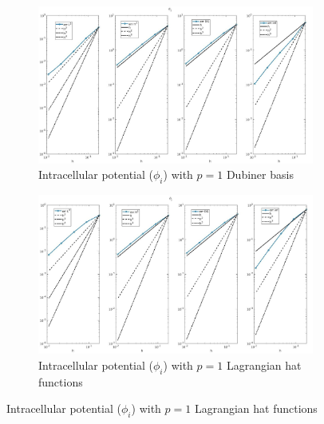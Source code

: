 \documentclass[a4paper,11pt]{article}
\begin{document}
\begin{figure}[H]
\caption{Comparison of the intracellular potential  ($\phi_i$)}
\label{phii_1}
\begin{subfigure}{\textwidth}
\begin{center}
\includegraphics[width = \textwidth]{./errors/D1_Phii_1.jpg}
\caption{Intracellular potential ($\phi_i$) with $p=1$ Dubiner basis}
\end{center}
\end{subfigure}
\begin{subfigure}{\textwidth}
\begin{center}
\includegraphics[width =\textwidth]{./errors/P1_Phii_1.jpg}
\caption{Intracellular potential ($\phi_i$) with $p=1$ Lagrangian hat functions}
\end{center}
\end{subfigure}
\end{figure}
\newpage
\end{document}
